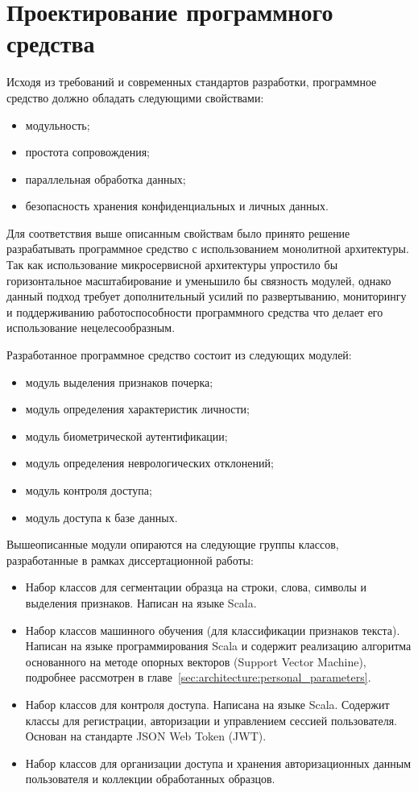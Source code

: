 \section{Проектирование программного средства}

Исходя из требований и современных стандартов разработки, программное средство должно обладать следующими свойствами:
\begin{itemize}
    \item модульность;
    \item простота сопровождения;
    \item параллельная обработка данных;
    \item безопасность хранения конфиденциальных и личных данных.
\end{itemize}

Для соответствия выше описанным свойствам было принято решение разрабатывать программное средство с использованием монолитной архитектуры. Так как использование микросервисной архитектуры упростило бы горизонтальное масштабирование и уменьшило бы связность модулей, однако данный подход требует дополнительный усилий по развертыванию, мониторингу и поддерживанию работоспособности программного средства что делает его использование нецелесообразным. 

Разработанное программное средство состоит из следующих модулей:
\begin{itemize}
    \item модуль выделения признаков почерка;
    \item модуль определения характеристик личности;
    \item модуль биометрической аутентификации;
    \item модуль определения неврологических отклонений;
    \item модуль контроля доступа;
    \item модуль доступа к базе данных.
\end{itemize}

Вышеописанные модули опираются на следующие группы классов, разработанные в рамках диссертационной работы:
\begin{itemize}
    \item Набор классов для сегментации образца на строки, слова, символы и выделения признаков. Написан на языке Scala.
    \item Набор классов машинного обучения (для классификации признаков текста). Написан на языке программирования Scala и содержит реализацию алгоритма основанного на методе опорных векторов (Support Vector Machine), подробнее рассмотрен в главе~\ref{sec:architecture:personal_parameters}.
    \item Набор классов для контроля доступа. Написана на языке Scala. Содержит классы для регистрации, авторизации и управлением сессией пользователя. Основан на стандарте JSON Web Token (JWT).
    \item Набор классов для организации доступа и хранения авторизационных данным пользователя и коллекции обработанных образцов.
\end{itemize}


